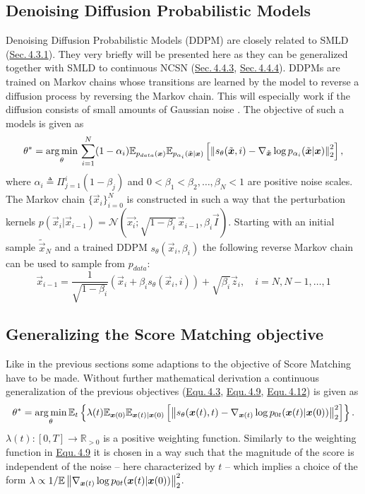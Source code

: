 \subsection{Denoising Diffusion Probabilistic Models}
Denoising Diffusion Probabilistic Models (DDPM) \cite{ho2020denoising} are closely related to SMLD (\hyperref[sec:4.3.1]{Sec.\,4.3.1}). They very briefly will be presented here as they can be generalized together with SMLD to continuous NCSN (\hyperref[sec:4.4.3]{Sec.\,4.4.3}, \hyperref[sec:4.4.4]{Sec.\,4.4.4}). DDPMs are trained on Markov chains whose transitions are learned by the model to reverse a diffusion process by reversing the Markov chain. This will especially work if the diffusion consists of small amounts of Gaussian noise \cite{ho2020denoising}. The objective of such a models is given as 
%
\begin{equation} \label{equ:4.12} 
    \theta^*=\underset{\theta}{\arg\min}\,\sum_{i=1}^N(1-\alpha_i)\mathbb{E}_{p_{data}(\boldsymbol{x})}\mathbb{E}_{p_{\alpha_i}(\tilde{\boldsymbol{x}}|\boldsymbol{x})}\left[\left\lVert s_\theta(\tilde{\boldsymbol{x}},i)-\nabla_{\tilde{\boldsymbol{x}}}\log p_{\alpha_i}(\tilde{\boldsymbol{x}}|\boldsymbol{x})\right\rVert_2^2\right],
\end{equation}
%
where $\alpha_i\triangleq\Pi_{j=1}^i(1-\beta_j)$ and $0<\beta_1<\beta_2,\dots,\beta_N<1$ are positive noise scales. The Markov chain $\{\vec{x}_i\}_{i=0}^N$ is constructed in such a way that the perturbation kernels $p(\vec{x}_i|\vec{x}_{i-1})=\mathcal{N}(\vec{x_i};\sqrt{1-\beta_i}\,\vec{x}_{i-1},\beta_i\vec{I})$. Starting with an initial sample $\tilde{\vec{x}}_N$ and a trained DDPM $s_\theta(\vec{x}_i, \beta_i)$ the following reverse Markov chain can be used to sample from $p_{data}$:
%
\begin{equation} \label{equ:4.13}
    \vec{x}_{i-1}=\frac{1}{\sqrt{1-\beta_i}}(\vec{x}_i+\beta_is_\theta(\vec{x}_i,i))+\sqrt{\beta_i}\vec{z}_i,\quad i=N,N-1,\dots,1
\end{equation}
%
\subsection{Generalizing the Score Matching objective} \label{sec:4.4.3}
Like in the previous sections some adaptions to the objective of Score Matching have to be made. Without further mathematical derivation a continuous generalization of the previous objectives (\hyperref[equ:4.3]{Equ.\,4.3}, \hyperref[equ:4.9]{Equ.\,4.9}, \hyperref[equ:4.12]{Equ.\,4.12}) is given as
%
\begin{equation} \label{equ:4.14}
    \theta^*=\underset{\theta}{\arg\min}\,\mathbb{E}_t\left\{\lambda(t)\mathbb{E}_{\boldsymbol{x}(0)}\mathbb{E}_{\boldsymbol{x}(t)|\boldsymbol{x}(0)}\left[\left\lVert s_\theta(\boldsymbol{x}(t),t)-\nabla_{\boldsymbol{x}(t)}\log p_{0t}(\boldsymbol{x}(t)|\boldsymbol{x}(0))\right\rVert_2^2\right]\right\}.
\end{equation}
%
$\lambda(t):[0,T]\rightarrow\mathbb{R}_{>0}$ is a positive weighting function. Similarly to the weighting function in \hyperref[equ:4.9]{Equ.\,4.9} it is chosen in a way such that the magnitude of the score is independent of the noise – here characterized by $t$ – which implies a choice of the form $\lambda\propto 1/\mathbb{E}\left\lVert\nabla_{\boldsymbol{x}(t)}\log p_{0t}(\boldsymbol{x}(t)|\boldsymbol{x}(0))\right\rVert_2^2$.

